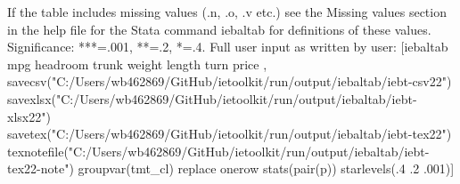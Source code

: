 If the table includes missing values (.n, .o, .v etc.) see the Missing values section in the help file for the Stata command iebaltab for definitions of these values. Significance: ***=.001, **=.2, *=.4. Full user input as written by user: [iebaltab mpg headroom trunk weight length turn price , savecsv("C:/Users/wb462869/GitHub/ietoolkit/run/output/iebaltab/iebt-csv22") savexlsx("C:/Users/wb462869/GitHub/ietoolkit/run/output/iebaltab/iebt-xlsx22") savetex("C:/Users/wb462869/GitHub/ietoolkit/run/output/iebaltab/iebt-tex22") texnotefile("C:/Users/wb462869/GitHub/ietoolkit/run/output/iebaltab/iebt-tex22-note") groupvar(tmt\_cl) replace onerow stats(pair(p)) starlevels(.4 .2 .001)] 
